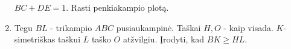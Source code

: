 \begin{enumerate}
  $BC+DE=1$. Rasti penkiakampio plotą. 
\item Tegu $BL$ - trikampio $ABC$ pusiaukampinė. Taškai
  $H,O$ - kaip visada. $K$-simetriškas taškui $L$ taško $O$
  atžvilgiu. Įrodyti, kad $BK\geq HL$.
\end{enumerate}

